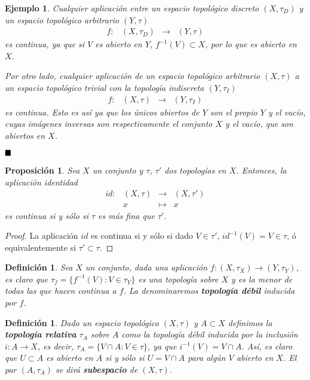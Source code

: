 \documentclass[12pt]{article}
\newtheorem{proposition}[theorem]{Proposición}
\newtheorem{definition}[theorem]{Definición}
\newtheorem{example}{Ejemplo}[theorem]
\begin{document}
\begin{example}Cualquier aplicación entre un espacio topológico discreto $(X, \tau_D)$ y un espacio topológico arbitrario $(Y, \tau)$ $$
\begin{array}{rccl}
f\colon &(X, \tau_D)& \longrightarrow & (Y, \tau)
\end{array}
$$ es continua, ya que si $V$ es abierto en $Y$, $f^{-1}(V) \subset X$, por lo que es abierto en $X$.

Por otro lado, cualquier aplicación de un espacio topológico arbitrario $(X, \tau)$ a un espacio topológico trivial con la topología indiscreta $(Y, \tau_I)$ $$
\begin{array}{rccl}
f\colon &(X, \tau)& \longrightarrow & (Y, \tau_I)
\end{array}
$$ es continua. Esto es así ya que los únicos abiertos de $Y$ son el propio $Y$ y el vacío, cuyas imágenes inversas son respectivamente el conjunto $X$ y el vacío, que son abiertos en $X$.
\end{example}

$\hfill \blacksquare$

\begin{proposition}Sea $X$ un conjunto y $\tau$, $\tau'$ dos topologías en $X$. Entonces, la aplicación identidad $$
\begin{array}{rccl}
id\colon &(X, \tau)& \longrightarrow & (X, \tau')\\
&x& \longmapsto &x
\end{array}
$$ es continua si y sólo si $\tau$ es más fina que $\tau'$.
\end{proposition}
\begin{proof}
La aplicación $id$ es continua si y sólo si dado $V \in \tau'$, $id^{-1}(V) = V \in \tau$, ó equivalentemente si $\tau' \subset \tau$.

\end{proof}

\begin{definition}Sea $X$ un conjunto, dada una aplicación $f \colon (X, \tau_X) \longrightarrow (Y, \tau_Y)$, es claro que $\tau_f = \lbrace f^{-1}(V): V \in \tau_Y\rbrace$ es una topología sobre $X$ y es la menor de todas las que hacen continua a $f$. La denominaremos \textbf{topología débil} inducida por $f$.
\end{definition}

\begin{definition}Dado un espacio topológico $(X, \tau)$ y $A \subset X$ definimos la \textbf{topología relativa} $\tau_A$ sobre $A$ como la topología débil inducida por la inclusión $i\colon A \longrightarrow X$, es decir, $\tau_A = \lbrace V \cap A :V \in \tau \rbrace$, ya que $i ^{-1}(V) = V \cap A$. Así, es claro que $U \subset A$ es abierto en $A$ si y sólo si $U = V \cap A$ para algún $V$ abierto en $X$. El par $(A, \tau_A)$ se dirá \textbf{subespacio} de $(X, \tau)$.
\end{definition}
\end{document}

